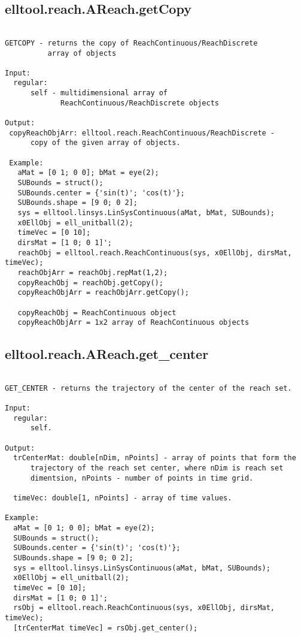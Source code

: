 \subsection{\texorpdfstring{elltool.reach.AReach.getCopy}{getCopy}}\label{method:elltool.reach.AReach.getCopy}
\begin{verbatim}

GETCOPY - returns the copy of ReachContinuous/ReachDiscrete
          array of objects

Input:
  regular:
      self - multidimensional array of
             ReachContinuous/ReachDiscrete objects

Output:
 copyReachObjArr: elltool.reach.ReachContinuous/ReachDiscrete -
      copy of the given array of objects.

 Example:
   aMat = [0 1; 0 0]; bMat = eye(2);
   SUBounds = struct();
   SUBounds.center = {'sin(t)'; 'cos(t)'};
   SUBounds.shape = [9 0; 0 2];
   sys = elltool.linsys.LinSysContinuous(aMat, bMat, SUBounds);
   x0EllObj = ell_unitball(2);
   timeVec = [0 10];
   dirsMat = [1 0; 0 1]';
   reachObj = elltool.reach.ReachContinuous(sys, x0EllObj, dirsMat, timeVec);
   reachObjArr = reachObj.repMat(1,2);
   copyReachObj = reachObj.getCopy();
   copyReachObjArr = reachObjArr.getCopy();

   copyReachObj = ReachContinuous object
   copyReachObjArr = 1x2 array of ReachContinuous objects
\end{verbatim}
\subsection{\texorpdfstring{elltool.reach.AReach.get\_center}{get\_center}}\label{method:elltool.reach.AReach.getcenter}
\begin{verbatim}

GET_CENTER - returns the trajectory of the center of the reach set.

Input:
  regular:
      self.

Output:
  trCenterMat: double[nDim, nPoints] - array of points that form the
      trajectory of the reach set center, where nDim is reach set
      dimentsion, nPoints - number of points in time grid.

  timeVec: double[1, nPoints] - array of time values.

Example:
  aMat = [0 1; 0 0]; bMat = eye(2);
  SUBounds = struct();
  SUBounds.center = {'sin(t)'; 'cos(t)'};
  SUBounds.shape = [9 0; 0 2];
  sys = elltool.linsys.LinSysContinuous(aMat, bMat, SUBounds);
  x0EllObj = ell_unitball(2);
  timeVec = [0 10];
  dirsMat = [1 0; 0 1]';
  rsObj = elltool.reach.ReachContinuous(sys, x0EllObj, dirsMat, timeVec);
  [trCenterMat timeVec] = rsObj.get_center();
\end{verbatim}
